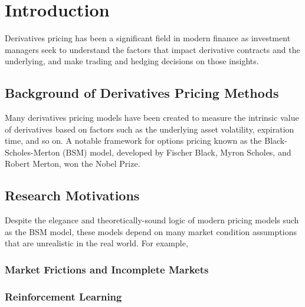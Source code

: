 \chapter{Introduction}

Derivatives pricing has been a significant field in modern finance as investment managers seek to understand the factors that impact derivative contracts and the underlying, and make trading and hedging decisions on those insights. 

\section{Background of Derivatives Pricing Methods}

Many derivatives pricing models have been created to measure the intrinsic value of derivatives based on factors such as the underlying asset volatility, expiration time, and so on. A notable framework for options pricing known as the Black-Scholes-Merton (BSM) model, developed by Fischer Black, Myron Scholes, and Robert Merton, won the Nobel Prize.

\section{Research Motivations}\label{ch1:sec}

Despite the elegance and theoretically-sound logic of modern pricing models such as the BSM model, these models depend on many market condition assumptions that are unrealistic in the real world. For example, 

\subsection{Market Frictions and Incomplete Markets}
\subsection{Reinforcement Learning}

%


